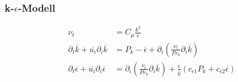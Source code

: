 \documentclass[11pt,t]{beamer}
\newcommand*\mean[1]{\overline{#1}}
\begin{document}
\begin{frame}
\frametitle{k-$\epsilon$-Modell}
\begin{align*}
\nu_t &= C_\mu \frac{k^2}{\epsilon}\\
\partial_t \mean{k}+ \mean{u_i}\partial_i \mean{k} &= P_k - \mean{\epsilon} + \partial_i(\frac{\nu_t}{Pr_k} \partial_i \mean{k})\\
\partial_t \mean{\epsilon}+ \mean{u_i}\partial_i \mean{\epsilon} &= \partial_i(\frac{\nu_t}{Pr_k} \partial_i \mean{k}) + \frac{\epsilon}{\mean{k}}(c_{\epsilon 1}P_{k}+c_{\epsilon 2}\mean{\epsilon})
\end{align*}
\end{frame}




\end{document}

